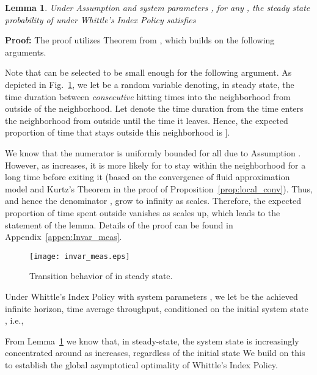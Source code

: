 \documentclass[11pt,twocolumn]{IEEEtran}
\newtheorem{lemma}{Lemma}
\begin{document}
\vspace{-2pt}
\begin{lemma}
\label{lemma:steady_dist} Under Assumption  and system
parameters , for any , the steady
state probability of  under Whittle's Index Policy
satisfies
\vspace{-3pt}

\end{lemma}

\vspace{-2pt}
\noindent \textbf{Proof:} The proof utilizes Theorem  from
\cite{Weiss_LD}, which builds on the following arguments.

Note that  can be selected to be small enough for the
following argument. As depicted in Fig.~\ref{fig:invar_meas}, we let
 be a random variable denoting, in steady state, the
time duration between \emph{consecutive} hitting times into the
neighborhood  from outside of the neighborhood. Let 
denote the time duration from the time  enters the
neighborhood  from outside until the time it leaves. Hence, the
expected proportion of time that  stays outside this
neighborhood is
].

We know that the numerator  is uniformly
bounded for all  due to Assumption . However, as 
increases, it is more likely for  to stay within the
neighborhood for a long time before exiting it (based on the convergence of fluid approximation model and Kurtz's Theorem in the proof of Proposition~\ref{prop:local_conv}). Thus,
 and hence the denominator , grow to infinity
as  scales. Therefore, the expected proportion of time spent
outside 
vanishes as  scales up, which leads to the statement of the
lemma. Details of the proof can be found in Appendix~\ref{appen:Invar_meas}. 

\begin{figure}
\centering
\texttt{[image: invar\_meas.eps]}
\vspace{-8pt}
\caption{Transition behavior of  in steady state.}
\label{fig:invar_meas}
\vspace{-12pt}
\end{figure}

\vspace{3pt} Under Whittle's Index Policy with system parameters
, we let  be
the achieved infinite horizon, time average throughput, conditioned
on the initial system state ,
i.e.,


\vspace{-5pt}From Lemma~\ref{lemma:steady_dist} we know that, in steady-state,
the system state  is increasingly
concentrated around  as 
increases, regardless of the initial state  We build on
this to establish the global asymptotical optimality of Whittle's
Index Policy.
\end{document}
